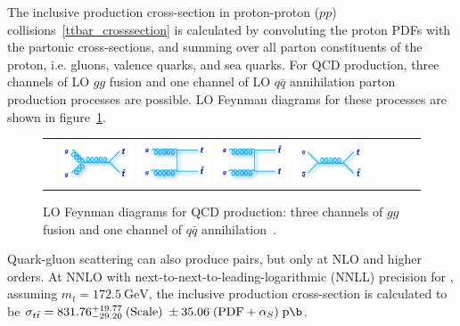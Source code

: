 The inclusive \ttbar production cross-section in proton-proton ($pp$) collisions~\ref{ttbar_crosssection} is calculated by convoluting the proton PDFs with the partonic cross-sections, and summing over all parton constituents of the proton, i.e. gluons, valence quarks, and sea quarks.
For QCD \ttbar production, three channels of LO $gg$ fusion and one channel of LO $q\bar{q}$ annihilation parton production processes are possible.
LO Feynman diagrams for these processes are shown in figure~\ref{ttbar_production_LO_feynman_diagrams}.
\begin{figure}[!h]
  \begin{center}
    \begin{tabular}{cccc}
        \includegraphics[width=0.225\textwidth]{fig_TopQuark/feynman_ttbar_LHC_gggtt.png}
        \includegraphics[width=0.225\textwidth]{fig_TopQuark/feynman_ttbar_LHC_ggttt.png}
        \includegraphics[width=0.225\textwidth]{fig_TopQuark/feynman_ttbar_LHC_ggttbart.png}
        \includegraphics[width=0.225\textwidth]{fig_TopQuark/feynman_ttbar_LHC_qqgtt.png}
    \end{tabular}
    \caption{LO Feynman diagrams for QCD \ttbar production: three channels of $gg$ fusion and one channel of $q\bar{q}$ annihilation~\cite{d0_diagrams}.
            }
    \label{ttbar_production_LO_feynman_diagrams}
  \end{center}
\end{figure}
Quark-gluon scattering can also produce \ttbar pairs, but only at NLO and higher orders.
At NNLO with next-to-next-to-leading-logarithmic (NNLL) precision for \beamenergy, assuming $m_t = \SI{172.5}{\GeV}$, the inclusive \ttbar production cross-section is calculated to be $\sigma_{\ttbar} = 831.76 \substack{+19.77 \\ -29.20} \; (\text{Scale}) \; \pm 35.06 \; (\text{PDF} + \alpha_S) \; \si{\pico \b}$.
